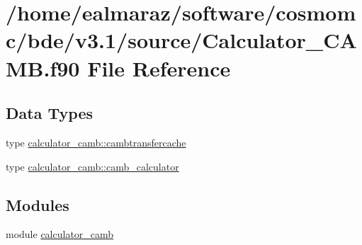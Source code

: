 \hypertarget{Calculator__CAMB_8f90}{}\section{/home/ealmaraz/software/cosmomc/bde/v3.1/source/\+Calculator\+\_\+\+C\+A\+MB.f90 File Reference}
\label{Calculator__CAMB_8f90}
\subsection*{Data Types}
\begin{DoxyCompactItemize}
\item 
type \mbox{\hyperlink{structcalculator__camb_1_1cambtransfercache}{calculator\+\_\+camb\+::cambtransfercache}}
\item 
type \mbox{\hyperlink{structcalculator__camb_1_1camb__calculator}{calculator\+\_\+camb\+::camb\+\_\+calculator}}
\end{DoxyCompactItemize}
\subsection*{Modules}
\begin{DoxyCompactItemize}
\item 
module \mbox{\hyperlink{namespacecalculator__camb}{calculator\+\_\+camb}}
\end{DoxyCompactItemize}

